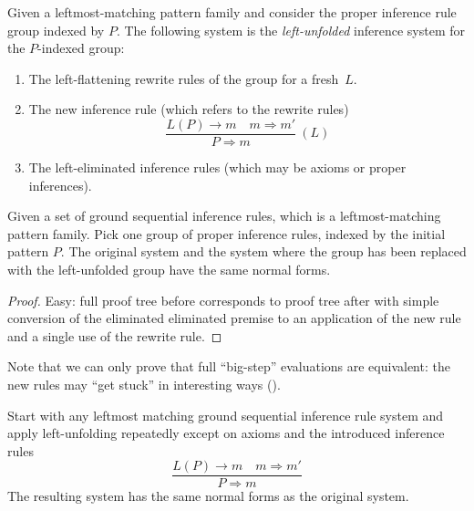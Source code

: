 \documentclass[letterpaper,11pt]{article}
\begin{document}
\begin{definition}
  Given a leftmost-matching pattern family and consider the proper inference rule group indexed by
  $P$. The following system is the \emph{left-unfolded} inference system for the $P$-indexed group:
  \begin{enumerate}

  \item The left-flattening rewrite rules of the group for a fresh~$L$.

  \item The new inference rule (which refers to the rewrite rules)
    \begin{displaymath}
      \dfrac{ L(P) → m \quad m ⇒ m' }{ P ⇒ m } ~ (L)
    \end{displaymath}

  \item The left-eliminated inference rules (which may be axioms or proper inferences).

  \end{enumerate}
\end{definition}

\begin{proposition}
  Given a set of ground sequential inference rules, which is a leftmost-matching pattern
  family. Pick one group of proper inference rules, indexed by the initial pattern $P$. The original
  system and the system where the group has been replaced with the left-unfolded group have the same
  normal forms.
\end{proposition}
\begin{proof}
  Easy: full proof tree before corresponds to proof tree after with simple conversion of the
  eliminated eliminated premise to an application of the new rule and a single use of the rewrite
  rule.
\end{proof}

Note that we can only prove that full ``big-step'' evaluations are equivalent: the new rules may
``get stuck'' in interesting ways ().

\begin{lemma}
  Start with any leftmost matching ground sequential inference rule system and apply left-unfolding
  repeatedly except on axioms and the introduced inference rules
  \begin{displaymath}
    \dfrac{ L(P) → m \quad m ⇒ m' }{ P ⇒ m }
  \end{displaymath}
  The resulting system has the same normal forms as the original system.
\end{lemma}
\end{document}

